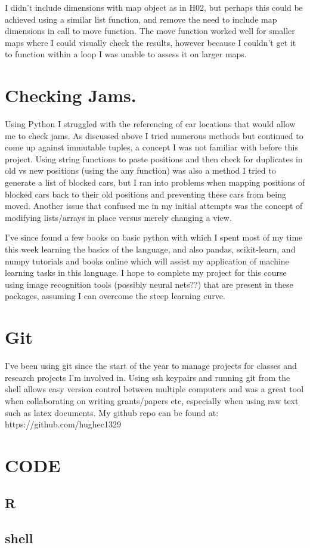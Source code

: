 \documentclass[12pt]{article}
\begin{document}
		I didn't include dimensions with map object as in H02, but perhaps this could be achieved using a similar list function, and remove the need to include map dimensions in call to move function.
		The move function worked well for smaller maps where I could visually check the results, however because I couldn't get it to function within a loop I was unable to assess it on larger maps.

	\section{Checking Jams.}
		Using Python I struggled with the referencing of car locations that would allow me to check jams. As discussed above I tried numerous methods but continued to come up against immutable tuples, a concept I was not familiar with before this project. 
		Using string functions to paste positions and then check for duplicates in old vs new positions (using the any function) was also a method I tried to generate a list of blocked cars, but I ran into problems when mapping positions of blocked cars back to their old positions and preventing these cars from being moved.
		Another issue that confused me in my initial attempts was the concept of modifying lists/arrays in place versus merely changing a view. 

		\newpage

		I've since found a few books on basic python with which I spent most of my time this week learning the basics of the language, and also pandas, scikit-learn, and numpy tutorials and books online which will assist my application of machine learning tasks in this language. 
		I hope to complete my project for this course using image recognition tools (possibly neural nets??) that are present in these packages, assuming I can overcome the steep learning curve.

	\section{Git}
		I've been using git since the start of the year to manage projects for classes and research projects I'm involved in.
		Using ssh keypairs and running git from the shell allows easy version control between multiple computers and was a great tool when collaborating on writing grants/papers etc, especially when using raw text such as latex documents.
		My github repo can be found at: https://github.com/hughec1329

\newpage
	\section{CODE}
	\subsection{R}
		
	\subsection{shell}
		
		
\end{document}
